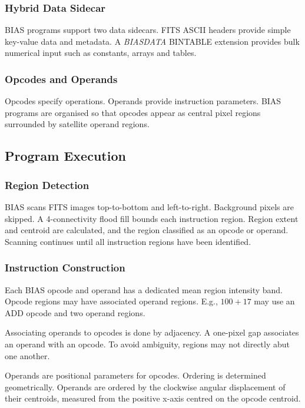\documentclass[11pt,twoside]{article}
\begin{document}

\subsubsection{Hybrid Data Sidecar}
BIAS programs support two data sidecars. FITS ASCII headers provide simple key-value data and metadata. A \textit{BIASDATA} BINTABLE extension provides bulk numerical input such as constants, arrays and tables.

\subsubsection{Opcodes and Operands}
Opcodes specify operations. Operands provide instruction parameters. BIAS programs are organised so that opcodes appear as central pixel regions surrounded by satellite operand regions.

\subsection{Program Execution}

\subsubsection{Region Detection}
BIAS scans FITS images top-to-bottom and left-to-right. Background pixels are skipped. A 4-connectivity flood fill bounds each instruction region. Region extent and centroid are calculated, and the region classified as an opcode or operand. Scanning continues until all instruction regions have been identified.

\subsubsection{Instruction Construction}
Each BIAS opcode and operand has a dedicated mean region intensity band. Opcode regions may have associated operand regions. E.g., $100 + 17$ may use an ADD opcode and two operand regions.

Associating operands to opcodes is done by adjacency. A one-pixel gap associates an operand with an opcode. To avoid ambiguity, regions may not directly abut one another.

Operands are positional parameters for opcodes. Ordering is determined geometrically. Operands are ordered by the clockwise angular displacement of their centroids, measured from the positive x-axis centred on the opcode centroid.
\end{document}
